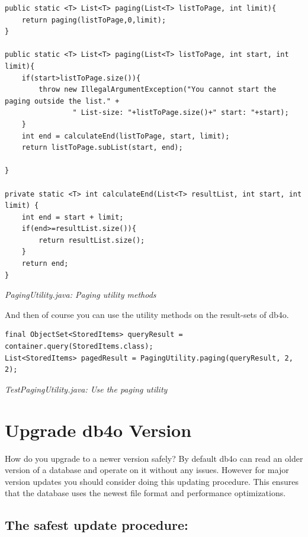 \begin{lstlisting}
public static <T> List<T> paging(List<T> listToPage, int limit){
    return paging(listToPage,0,limit);
}

public static <T> List<T> paging(List<T> listToPage, int start, int limit){
    if(start>listToPage.size()){
        throw new IllegalArgumentException("You cannot start the paging outside the list." +
                " List-size: "+listToPage.size()+" start: "+start);
    }
    int end = calculateEnd(listToPage, start, limit);
    return listToPage.subList(start, end);

}

private static <T> int calculateEnd(List<T> resultList, int start, int limit) {
    int end = start + limit;
    if(end>=resultList.size()){
        return resultList.size();
    }
    return end;
}
\end{lstlisting}

{\small\itshape PagingUtility.java: Paging utility methods\par}
\medskip

And then of course you can use the utility methods on the result-sets of db4o.

\begin{lstlisting}
final ObjectSet<StoredItems> queryResult = container.query(StoredItems.class);
List<StoredItems> pagedResult = PagingUtility.paging(queryResult, 2, 2);
\end{lstlisting}

{\small\itshape TestPagingUtility.java: Use the paging utility\par}
\medskip

\section{Upgrade db4o Version}
\label{ref:best-practises-updating-db4o-version}

How do you upgrade to a newer version safely? By default db4o can read an older version of a database and operate on it without any issues. However for major version updates you should consider doing this updating procedure. This ensures that the database uses the newest file format and performance optimizations.

\subsection*{The safest update procedure:}

